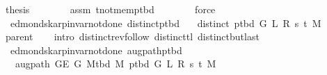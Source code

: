 \begin{isabellebody}
\ {\isacharquery}{\kern0pt}thesis\isanewline
\ \ \ \ \ \ \isamarkupfalse%
\ assm\ t{\isacharunderscore}{\kern0pt}not{\isacharunderscore}{\kern0pt}mem{\isacharunderscore}{\kern0pt}p{\isacharunderscore}{\kern0pt}tbd\isanewline
\ \ \ \ \ \ \isamarkupfalse%
\ force\isanewline
\ \ \isamarkupfalse%
\isanewline
{}\isamarkupfalse%
%
\endisatagproof
{\isafoldproof}%
%
\isadelimproof
\isanewline
%
\endisadelimproof
%
\isadeliminvisible
\isanewline
%
\endisadeliminvisible
%
\isataginvisible
{}\isamarkupfalse%
\ {\isacharparenleft}{\kern0pt}\ edmonds{\isacharunderscore}{\kern0pt}karp{\isacharunderscore}{\kern0pt}invar{\isacharunderscore}{\kern0pt}not{\isacharunderscore}{\kern0pt}done{\isacharunderscore}{\kern0pt}{}{\isacharparenright}{\kern0pt}\ distinct{\isacharunderscore}{\kern0pt}p{\isacharunderscore}{\kern0pt}tbd{\isacharcolon}{\kern0pt}\isanewline
\ \ \ {\isachardoublequoteopen}distinct\ {\isacharparenleft}{\kern0pt}p{\isacharunderscore}{\kern0pt}tbd\ G\ L\ R\ s\ t\ M{\isacharparenright}{\kern0pt}{\isachardoublequoteclose}%
\endisataginvisible
{\isafoldinvisible}%
%
\isadeliminvisible
\isanewline
%
\endisadeliminvisible
%
\isadelimproof
\ \ %
\endisadelimproof
%
\isatagproof
{}\isamarkupfalse%
\ parent\isanewline
\ \ \isamarkupfalse%
\ {\isacharparenleft}{\kern0pt}intro\ distinct{\isacharunderscore}{\kern0pt}rev{\isacharunderscore}{\kern0pt}follow\ distinct{\isacharunderscore}{\kern0pt}tl\ distinct{\isacharunderscore}{\kern0pt}butlast{\isacharparenright}{\kern0pt}%
\endisatagproof
{\isafoldproof}%
%
\isadelimproof
\isanewline
%
\endisadelimproof
\isanewline
{}\isamarkupfalse%
\ {\isacharparenleft}{\kern0pt}\ edmonds{\isacharunderscore}{\kern0pt}karp{\isacharunderscore}{\kern0pt}invar{\isacharunderscore}{\kern0pt}not{\isacharunderscore}{\kern0pt}done{\isacharunderscore}{\kern0pt}{}{\isacharparenright}{\kern0pt}\ augpath{\isacharunderscore}{\kern0pt}p{\isacharunderscore}{\kern0pt}tbd{\isacharcolon}{\kern0pt}\isanewline
\ \ \ {\isachardoublequoteopen}augpath\ {\isacharparenleft}{\kern0pt}G{\isachardot}{\kern0pt}E\ G{\isacharparenright}{\kern0pt}\ {\isacharparenleft}{\kern0pt}M{\isacharunderscore}{\kern0pt}tbd\ M{\isacharparenright}{\kern0pt}\ {\isacharparenleft}{\kern0pt}p{\isacharunderscore}{\kern0pt}tbd\ G\ L\ R\ s\ t\ M{\isacharparenright}{\kern0pt}{\isachardoublequoteclose}\isanewline
%
\isadelimproof
%
\endisadelimproof
%
\isatagproof
{}\isamarkupfalse%

\end{isabellebody}
